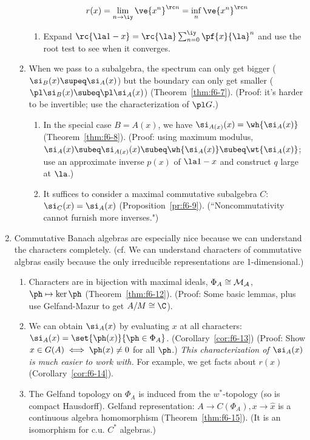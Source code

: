 \begin{enumerate}
\begin{enumerate}
\[
r(x)=\lim_{n\to \iy} \ve{x^n}^{\rc n}=\inf_n \ve{x^n}^{\rc n}
\]
\begin{enumerate}
\item
Expand $\rc{\la 1-x}=\rc{\la}\sum_{n=0}^{\iy} \pf{x}{\la}^n$ and use the root test to see when it converges.
\end{enumerate}
\item When we pass to a subalgebra, the spectrum can only get bigger ($\si_B(x)\supeq \si_A(x)$) but the boundary can only get smaller ($\pl \si_B(x)\subeq \pl \si_A(x)$) (Theorem~\ref{thm:f6-7}). (Proof: it's harder to be invertible; use the characterization of $\pl G$.) 
\begin{enumerate}
\item
In the special case $B=A(x)$, we have $\si_{A(x)}(x)=\wh{\si_A(x)}$ (Theorem~\ref{thm:f6-8}). (Proof: using maximum modulus, $\si_{A}(x)\subeq \si_{A(x)}(x)\subeq\wh{\si_A(x)}\subeq \wt{\si_A(x)}$; use an approximate inverse $p(x)$ of $\la1-x$ and construct $q$ large at $\la$.)
\item It suffices to consider a maximal commutative subalgebra $C$: $\si_C(x)=\si_A(x)$ (Proposition~\ref{pr:f6-9}). (``Noncommutativity cannot furnish more inverses.") 
\end{enumerate}
\end{enumerate}
\item Commutative Banach algebras are especially nice because we can understand the characters completely. (cf. We can understand characters of commutative algbras easily because the only irreducible representations are 1-dimensional.) 
\begin{enumerate}
\item
Characters are in bijection with maximal ideals, $\Phi_A\cong \cal M_A$, $\ph\mapsto \ker \ph$ (Theorem~\ref{thm:f6-12}). (Proof: Some basic lemmas, plus use Gelfand-Mazur to get $A/M\cong \C$).
\item
We can obtain $\si_A(x)$ by evaluating $x$ at all characters: $\si_A(x)=\set{\ph(x)}{\ph\in \Phi_A}$. (Corollary~\ref{cor:f6-13}) (Proof: Show $x\in G(A)\iff \ph(x)\ne 0$ for all $\ph$.) {\it This characterization of $\si_A(x)$ is much easier to work with.} For example, we get facts about $r(x)$ (Corollary~\ref{cor:f6-14}).
\item The Gelfand topology on $\Phi_A$ is induced from the $w^*$-topology (so is compact Hausdorff).
Gelfand representation: $A\to C(\Phi_A), x\to \hat x$ is a continuous algebra homomorphism (Theorem~\ref{thm:f6-15}). (It is an isomorphism for c.u. $C^*$ algebras.)
\end{enumerate}
\end{enumerate}

